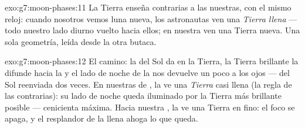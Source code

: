 \begin{solution}{exo:g7:moon-phases:11}
La Tierra enseña  contrarias a las nuestras, con el mismo reloj:
cuando nosotros vemos luna nueva, los astronautas ven una \emph{Tierra
llena} --- todo nuestro lado diurno vuelto hacia ellos; en nuestra
 ven una Tierra nueva. Una sola geometría, leída desde la
otra butaca.
\end{solution}

\begin{solution}{exo:g7:moon-phases:12}
El camino: la  del Sol da en la Tierra, la Tierra brillante la
difunde hacia la  y el lado de noche de la  nos devuelve
un poco a los ojos ---  del Sol reenviada dos veces. En nuestras
 de , la  ve una \emph{Tierra} casi llena (la
regla de las  contrarias): su lado de noche queda iluminado por
la Tierra más brillante posible ---  cenicienta máxima. Hacia
nuestra , la  ve una Tierra en  fino:
el foco se apaga, y el resplandor de la  llena ahoga lo que
queda.
\end{solution}

